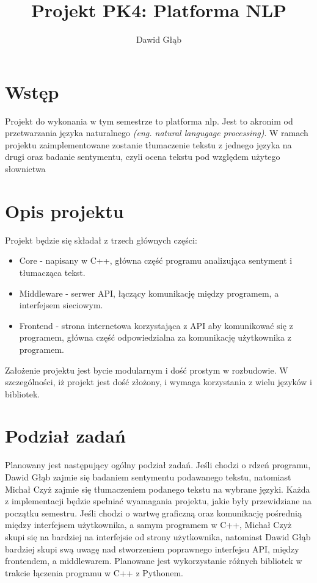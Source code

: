 \documentclass{article}
\title{Projekt PK4: Platforma NLP}
\author{Dawid Głąb}
\begin{document}
\maketitle

\section{Wstęp}

Projekt do wykonania w tym semestrze to platforma nlp. Jest to akronim od przetwarzania języka naturalnego \textit{(eng. natural langugage processing)}. W ramach projektu zaimplementowane zostanie tłumaczenie tekstu z jednego języka na drugi oraz badanie sentymentu, czyli ocena tekstu pod względem użytego słownictwa

\section{Opis projektu}

Projekt będzie się składał z trzech głównych części:

\begin{itemize}
  \item Core - napisany w C++, główna część programu analizująca sentyment i tłumacząca tekst.
  \item Middleware - serwer API, łączący komunikację między programem, a interfejsem sieciowym.
  \item Frontend - strona internetowa korzystająca z API aby komunikować się z programem, główna część odpowiedzialna za komunikację użytkownika z programem.
\end{itemize}

Założenie projektu jest bycie modularnym i dość prostym w rozbudowie. W szczególności, iż projekt jest dość złożony, i wymaga korzystania z wielu języków i bibliotek.

\section{Podział zadań}

Planowany jest następujący ogólny podział zadań. Jeśli chodzi o rdzeń programu, Dawid Głąb zajmie się badaniem sentymentu podawanego tekstu, natomiast Michał Czyż zajmie się tłumaczeniem podanego tekstu na wybrane języki. Każda z implementacji będzie spełniać wyamagania projektu, jakie były przewidziane na początku semestru. Jeśli chodzi o wartwę graficzną oraz komunikację pośrednią między interfejsem użytkownika, a samym programem w C++, Michał Czyż skupi się na bardziej na interfejsie od strony użytkownika, natomiast Dawid Głąb bardziej skupi swą uwagę nad stworzeniem poprawnego interfejsu API, między frontendem, a middlewarem. Planowane jest wykorzystanie różnych bibliotek w trakcie łączenia programu w C++ z Pythonem. 
\end{document}
